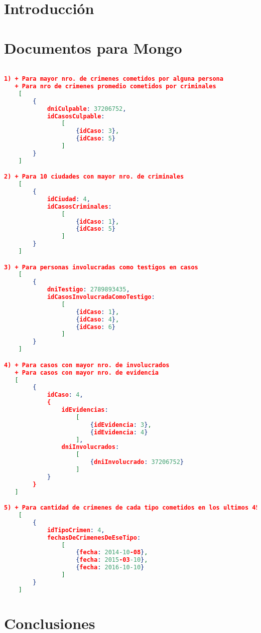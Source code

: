 \documentclass[11pt, a4paper]{article}
\begin{document}

\maketitle
\newpage

\tableofcontents
\newpage

%
\section{Introducción}

\section{Documentos para Mongo}

\begin{lstlisting}[language=json]

1) + Para mayor nro. de crimenes cometidos por alguna persona 
   + Para nro de crimenes promedio cometidos por criminales
	[
		{
			dniCulpable: 37206752,
			idCasosCulpable:
				[ 
					{idCaso: 3}, 
					{idCaso: 5} 
				]
		}
	]

2) + Para 10 ciudades con mayor nro. de criminales
	[
		{
			idCiudad: 4,
			idCasosCriminales:
				[
					{idCaso: 1}, 
					{idCaso: 5}
				]
		}
	]

3) + Para personas involucradas como testigos en casos
	[
		{
			dniTestigo: 2789893435,
			idCasosInvolucradaComoTestigo:
				[
					{idCaso: 1},
					{idCaso: 4},
					{idCaso: 6}
				]
		}
	]

4) + Para casos con mayor nro. de involucrados
   + Para casos con mayor nro. de evidencia
   [
   		{
   			idCaso: 4,
	   		{
	   			idEvidencias: 
	   				[	
	   					{idEvidencia: 3},
	   					{idEvidencia: 4}
	   				],
	   			dniInvolucrados:
	   				[
	   					{dniInvolucrado: 37206752}
	   				]
	   		}
	   	}
   ]

5) + Para cantidad de crimenes de cada tipo cometidos en los ultimos 45 dias
	[
		{
			idTipoCrimen: 4,
			fechasDeCrimenesDeEseTipo:
				[
					{fecha: 2014-10-08},
					{fecha: 2015-03-10},
					{fecha: 2016-10-10}
				]
		}
	]

\end{lstlisting}

\section{Conclusiones}
\end{document}
